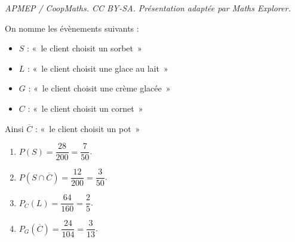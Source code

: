 \documentclass[10pt]{article}
\begin{document}
\noindent\textit{APMEP / CoopMaths. CC BY-SA. Présentation adaptée par Maths Explorer.}\par\medskip
On nomme les évènements suivants :

\begin{itemize}
	\item $S$ : «~le client choisit un sorbet~»
	\item $L$ : «~le client choisit une glace au lait~»
	\item $G$ : «~le client choisit une crème glacée~»
	\item $C$ : «~le client choisit un cornet~»
\end{itemize}

	Ainsi $\overline{C}$ : «~le client choisit un pot~»

\begin{enumerate}
	\item $P\left(S\right) = \dfrac{28}{200} = \dfrac{7}{50}$.

	\item $P\left(S\cap \overline{C}\right) = \dfrac{12}{200} = \dfrac{3}{50}$.

	\item $P_{C}\left(L\right) = \dfrac{64}{160} = \dfrac{2}{5}$.

	\item $P_{G}\left(\overline{C}\right) = \dfrac{24}{104} = \dfrac{3}{13}$.
\end{enumerate}

\end{document}
